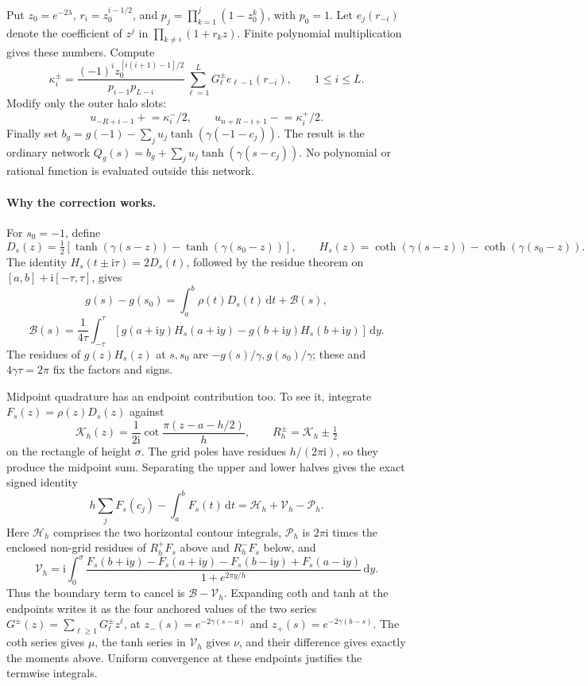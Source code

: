 \documentclass[11pt,letterpaper]{article}
\newcommand{\dd}{\,\mathrm d}
\newcommand{\ii}{\mathrm i}
\theoremstyle{definition}
\theoremstyle{remark}
\begin{document}
Put \(z_0=e^{-2\lambda}\), \(r_i=z_0^{i-1/2}\), and
\(p_j=\prod_{k=1}^j(1-z_0^k)\), with \(p_0=1\).
Let \(e_j(r_{-i})\) denote the coefficient of \(z^j\) in
\(\prod_{k\ne i}(1+r_kz)\). Finite polynomial multiplication gives these
numbers. Compute
\[
 \kappa_i^\pm=
 \frac{(-1)^i z_0^{[i(i+1)-1]/2}}{p_{i-1}p_{L-i}}
       \sum_{\ell=1}^L G_\ell^\pm e_{\ell-1}(r_{-i}),\qquad 1\le i\le L.
\]
Modify only the outer halo slots:
\[
 u_{-R+i-1}\mathrel{+}=\kappa_i^-/2,\qquad
 u_{n+R-i+1}\mathrel{-}=\kappa_i^+/2.
\]
Finally set \(b_g=g(-1)-\sum_j u_j\tanh(\gamma(-1-c_j))\).
The result is the ordinary network
\(Q_g(s)=b_g+\sum_j u_j\tanh(\gamma(s-c_j))\).
No polynomial or rational function is evaluated outside this network.

\paragraph{Why the correction works.}
For \(s_0=-1\), define
\[
 D_s(z)=\tfrac12[\tanh(\gamma(s-z))-\tanh(\gamma(s_0-z))],\qquad
 H_s(z)=\coth(\gamma(s-z))-\coth(\gamma(s_0-z)).
\]
The identity \(H_s(t\pm\ii\tau)=2D_s(t)\), followed by the residue theorem
on \([a,b]+\ii[-\tau,\tau]\), gives
\[
 g(s)-g(s_0)=\int_a^b\rho(t)D_s(t)\dd t+\mathcal B(s),
\]
\[
 \mathcal B(s)=\frac1{4\tau}\int_{-\tau}^{\tau}
 [g(a+\ii y)H_s(a+\ii y)-g(b+\ii y)H_s(b+\ii y)]\dd y.
\]
The residues of \(g(z)H_s(z)\) at \(s,s_0\) are
\(-g(s)/\gamma,g(s_0)/\gamma\); these and \(4\gamma\tau=2\pi\)
fix the factors and signs.

Midpoint quadrature has an endpoint contribution too. To see it, integrate
\(F_s(z)=\rho(z)D_s(z)\) against
\[
 \mathcal K_h(z)=\frac1{2\ii}\cot\frac{\pi(z-a-h/2)}h,
 \qquad R_h^\pm=\mathcal K_h\pm\tfrac12
\]
on the rectangle of height \(\sigma\). The grid poles have residues
\(h/(2\pi\ii)\), so they produce the midpoint sum. Separating the upper
and lower halves gives the exact signed identity
\[
 h\sum_jF_s(c_j)-\int_a^bF_s(t)\dd t
       =\mathcal H_h+\mathcal V_h-\mathcal P_h.
\]
Here \(\mathcal H_h\) comprises the two horizontal contour integrals,
\(\mathcal P_h\) is \(2\pi\ii\) times the enclosed non-grid residues of
\(R_h^+F_s\) above and \(R_h^-F_s\) below, and
\[
 \mathcal V_h=\ii\int_0^\sigma
 \frac{F_s(b+\ii y)-F_s(a+\ii y)-F_s(b-\ii y)+F_s(a-\ii y)}
      {1+e^{2\pi y/h}}\dd y.
\]
Thus the boundary term to cancel is \(\mathcal B-\mathcal V_h\).
Expanding coth and tanh at the endpoints writes it as the four anchored
values of the two series \(G^\pm(z)=\sum_{\ell\ge1}G_\ell^\pm z^\ell\),
at \(z_-(s)=e^{-2\gamma(s-a)}\) and
\(z_+(s)=e^{-2\gamma(b-s)}\). The coth series gives \(\mu\), the tanh
series in \(\mathcal V_h\) gives \(\nu\), and their difference gives exactly
the moments above. Uniform convergence at these endpoints justifies the
termwise integrals.
\end{document}
